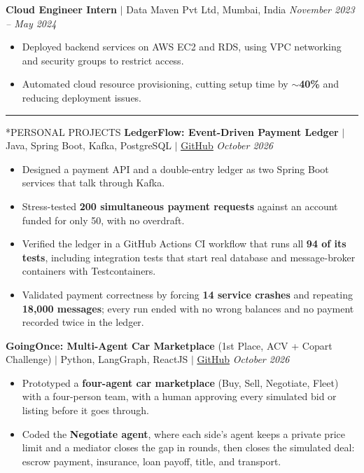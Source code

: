 \documentclass[10pt, letterpaper]{article}
\makeatletter
\newcommand{\sectiondivider}{\vspace{0.62em}\hrule\vspace{0.54em}}
\newcommand{\rolegap}{\vspace{6.6pt}}
\renewcommand{\section}{\@startsection{section}{1}{\z@}{-0.46em \@plus -0.1ex \@minus -0.1ex}{0.36ex \@plus 0.1ex}{\normalfont\large\bfseries}}
\makeatother
\begin{document}
\rolegap
\noindent\textbf{Cloud Engineer Intern} $|$ Data Maven Pvt Ltd, Mumbai, India \hfill \textit{November 2023 -- May 2024}
\begin{itemize}\setlength{\itemsep}{0.78pt}
\item Deployed backend services on AWS EC2 and RDS, using VPC networking and security groups to restrict access.
\item Automated cloud resource provisioning, cutting setup time by \textbf{$\sim$40\%} and reducing deployment issues.
\end{itemize}
\sectiondivider
\section*{PERSONAL PROJECTS}
\noindent\textbf{LedgerFlow: Event-Driven Payment Ledger} $|$ Java, Spring Boot, Kafka, PostgreSQL $|$ \href{https://github.com/Jaypath456/ledgerFlow}{\underline{GitHub}} \hfill \textit{October 2026}
\begin{itemize}\setlength{\itemsep}{0.78pt}
\item Designed a payment API and a double-entry ledger as two Spring Boot services that talk through Kafka.
\item Stress-tested \textbf{200 simultaneous payment requests} against an account funded for only 50, with no overdraft.
\item Verified the ledger in a GitHub Actions CI workflow that runs all \textbf{94 of its tests}, including integration tests that start real database and message-broker containers with Testcontainers.
\item Validated payment correctness by forcing \textbf{14 service crashes} and repeating \textbf{18,000 messages}; every run ended with no wrong balances and no payment recorded twice in the ledger.
\end{itemize}
\rolegap
\noindent\textbf{GoingOnce: Multi-Agent Car Marketplace} (1st Place, ACV + Copart Challenge) $|$ Python, LangGraph, ReactJS $|$ \href{https://github.com/raunakpandey1/goingonce}{\underline{GitHub}} \hfill \textit{October 2026}
\begin{itemize}\setlength{\itemsep}{0.78pt}
\item Prototyped a \textbf{four-agent car marketplace} (Buy, Sell, Negotiate, Fleet) with a four-person team, with a human approving every simulated bid or listing before it goes through.
\item Coded the \textbf{Negotiate agent}, where each side's agent keeps a private price limit and a mediator closes the gap in rounds, then closes the simulated deal: escrow payment, insurance, loan payoff, title, and transport.
\end{itemize}
\end{document}
